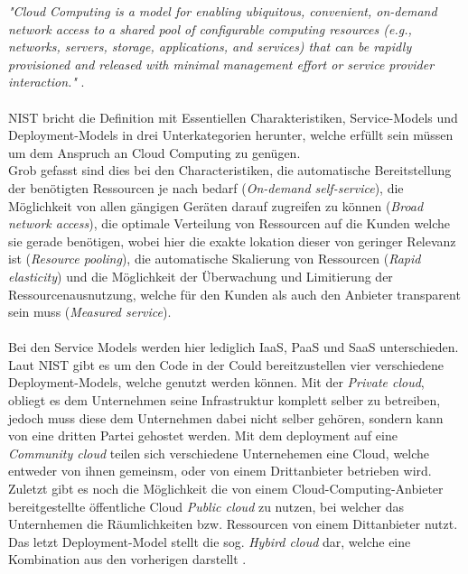 \textit{"Cloud Computing is a model for enabling ubiquitous, convenient, on-demand network access to a shared pool of configurable computing resources (e.g., networks, servers, storage, applications, and services) that can be rapidly provisioned and released with minimal management effort or service provider interaction."} \cite{mell2011nist}.\\\\ 
NIST bricht die Definition mit Essentiellen Charakteristiken, Service-Models und Deployment-Models in drei Unterkategorien herunter, welche erfüllt sein müssen um dem Anspruch an Cloud Computing zu genügen. \\
Grob gefasst sind dies bei den Characteristiken, die automatische Bereitstellung der benötigten Ressourcen je nach bedarf (\textit{On-demand self-service}), die Möglichkeit von allen gängigen Geräten darauf zugreifen zu können (\textit{Broad network access}), die optimale Verteilung von Ressourcen auf die Kunden welche sie gerade benötigen, wobei hier die exakte lokation dieser von geringer Relevanz ist (\textit{Resource pooling}), die automatische Skalierung von Ressourcen (\textit{Rapid elasticity}) und die Möglichkeit der Überwachung und Limitierung der Ressourcenausnutzung, welche für den Kunden als auch den Anbieter transparent sein muss (\textit{Measured service}).\\\\ 
Bei den Service Models werden hier lediglich IaaS, PaaS und SaaS unterschieden. Laut NIST gibt es um den Code in der Could bereitzustellen vier verschiedene Deployment-Models, welche genutzt werden können. Mit der \textit{Private cloud}, obliegt es dem Unternehmen seine Infrastruktur komplett selber zu betreiben, jedoch muss diese dem Unternehmen dabei nicht selber gehören, sondern kann von eine dritten Partei gehostet werden. Mit dem deployment auf eine \textit{Community cloud} teilen sich verschiedene Unternehemen eine Cloud, welche entweder von ihnen gemeinsm, oder von einem Drittanbieter betrieben wird. Zuletzt gibt es noch die Möglichkeit die von einem Cloud-Computing-Anbieter bereitgestellte öffentliche Cloud \textit{Public cloud} zu nutzen, bei welcher das Unternhemen die Räumlichkeiten bzw. Ressourcen von einem Dittanbieter nutzt. Das letzt Deployment-Model stellt die sog. \textit{Hybird cloud} dar, welche eine Kombination aus den vorherigen darstellt \cite{mell2011nist}.
